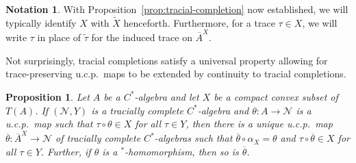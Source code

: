 \documentclass[a4paper,11pt]{amsart}
\newtheorem{proposition}[theorem]{Proposition}
\theoremstyle{definition}
\newtheorem{notation}[theorem]{Notation}
\numberwithin{equation}{section}
\numberwithin{theorem}{section}
\newcommand{\completion}[2]{\overline{#1}^{#2}}
\begin{document}
\begin{notation}
	With Proposition~\ref{prop:tracial-completion} now established, we will typically identify $X$ with $\widetilde{X}$ henceforth. Furthermore, for a trace $\tau \in X$, we will write $\tau$ in place of $\widetilde\tau$ for the induced trace on $\completion{A}{X}$.
\end{notation}

Not surprisingly, tracial completions satisfy a universal property allowing for trace-preserving u.c.p.\ maps to be extended by continuity to tracial completions.

\begin{proposition}\label{prop:extend-by-continuity}
	Let $A$ be a $C^*$-algebra and let $X$ be a compact convex subset of $T(A)$.  If $(\mathcal N, Y)$ is a tracially complete $C^*$-algebra and $\theta \colon A \rightarrow \mathcal N$ is a u.c.p.\ map such that $\tau \circ \theta \in X$ for all $\tau \in Y$, then there is a unique u.c.p.\ map $\overline{\theta} \colon \completion{A}{X} \rightarrow \mathcal N$ of tracially complete $C^*$-algebras such that $\overline{\theta} \circ \alpha_X = \theta$ and $\tau \circ \overline{\theta} \in X$ for all $\tau \in Y$.  Further, if $\theta$ is a $^*$-homomorphism, then so is $\overline{\theta}$.
\end{proposition}
\end{document}
